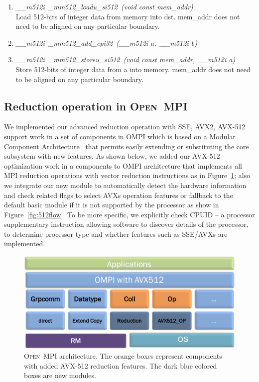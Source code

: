 \documentclass[sigconf]{acmart}
\newcommand{\ompi}[0]{\textsc{Open~MPI}\xspace}
\begin{document}
\begin{enumerate}
  \item \emph{\textit{\_\_m512i\ \_mm512\_loadu\_si512\ (void const\* mem\_addr)}} \\
  Load 512-bits of integer data from memory into dst. mem\_addr does not need to be aligned on any particular boundary.
  \item \emph{\textit{\_\_m512i\ \_mm512\_add\_epi32\ (\_\_m512i a,\ \_\_m512i b)}}
  \item \emph{\textit{\_\_m512i\ \_mm512\_storeu\_si512\ (void const\* mem\_addr, \_\_m512i a)}} \\
  Store 512-bits of integer data from a into memory. mem\_addr does not need to be aligned on any particular boundary.
\end{enumerate}

\subsection{Reduction operation in \ompi}
We implemented our advanced reduction operation with SSE, AVX2, AVX-512 support work
in a set of components in OMPI which is based on a Modular Component
Architecture~\cite{dong_prrte} that permits easily extending or substituting the core subsystem with new features.
As shown below, we added our AVX-512 optimization work in a components to OMPI
architecture that implements all MPI reduction operations with vector reduction instructions as in Figure~\ref{fig:avx_mca}; also we integrate our new module to
automatically detect the hardware information and check related flags to select AVXs operation
features or fallback to the default basic module if it is not supported by the
processor as show in Figure~\ref{fig:512flow}. To be more specific, we explicitly check CPUID -- a processor
supplementary instruction allowing software to discover details of the processor, to
determine processor type and whether features such as SSE/AVXs are implemented.

\begin{figure}[h]
    \centering
    \includegraphics[width=\linewidth]{avx-mca.pdf}
    \caption{\ompi architecture. The orange boxes represent components with added AVX-512 reduction features. The dark blue colored boxes are new modules.}
    \label{fig:avx_mca}
\end{figure}
\end{document}
